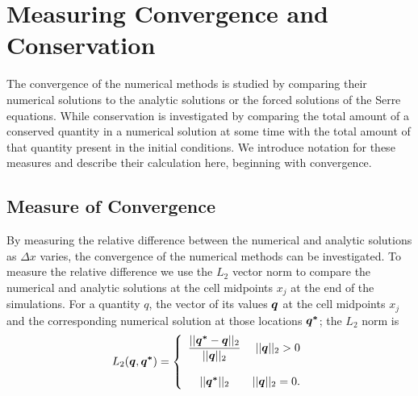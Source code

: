 \section{Measuring Convergence and Conservation}
The convergence of the numerical methods is studied by comparing their numerical solutions to the analytic solutions or the forced solutions of the Serre equations. While conservation is investigated by comparing the total amount of a conserved quantity in a numerical solution at some time with the total amount of that quantity present in the initial conditions. We introduce notation for these measures and describe their calculation here, beginning with convergence.

\subsection{Measure of Convergence}
By measuring the relative difference between the numerical and analytic solutions as $\Delta x$ varies, the convergence of the numerical methods can be investigated. To measure the relative difference we use the $L_2$ vector norm to compare the numerical and analytic solutions at the cell midpoints $x_j$ at the end of the simulations. For a quantity $q$, the vector of its values $\boldsymbol{q}$ at the cell midpoints $x_j$ and the corresponding numerical solution at those locations $\boldsymbol{q^*}$; the $L_2$ norm is
\begin{equation*}
L_2(\boldsymbol{q},\boldsymbol{q^*}) =  \left\lbrace \begin{array}{c r} 
\dfrac{||\boldsymbol{q^*} - \boldsymbol{q}||_{2}}{||\boldsymbol{q}||_{2}} & ||\boldsymbol{q}||_{2} > 0 \\ \\
{||\boldsymbol{q^*}||_{2}} & ||\boldsymbol{q}||_{2} = 0 . \end{array}\right. 
\label{eqn:L1qdef} 
\end{equation*}




